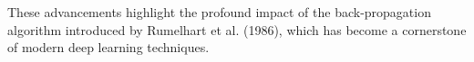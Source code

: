 \documentclass[10pt]{article}
\begin{document}
These advancements highlight the profound impact of the back-propagation algorithm introduced by Rumelhart et al. (1986), which has become a cornerstone of modern deep learning techniques.







% 
% 
\end{document}
